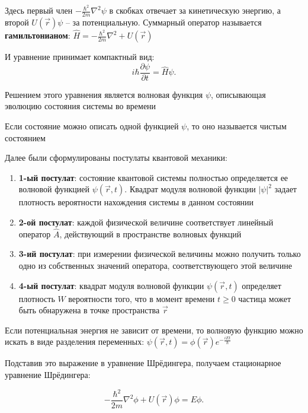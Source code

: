 \documentclass[12pt]{article}
\begin{document}
Здесь первый член $-\frac{\hbar^2}{2m}\nabla^2 \psi$ в скобках отвечает за кинетическую энергию, а второй $U(\vec r) \psi$ -- за потенциальную. Суммарный оператор называется \textbf{гамильтонианом}: $\hat{H} = -\frac{\hbar^2}{2m}\nabla^2 + U(\vec r)$

И уравнение принимает компактный вид:
\[
i\hbar \frac{\partial \psi}{\partial t} = \hat{H}\psi.
\]

\mediumvspace

Решением этого уравнения является волновая функция $\psi$, описывающая эволюцию состояния системы во времени

Если состояние можно описать одной функцией $\psi$, то оно называется чистым состоянием

\mediumvspace

Далее были сформулированы постулаты квантовой механики:

\begin{enumerate}
    \item \textbf{1-ый постулат}: 
    состояние квантовой системы полностью определяется ее волновой функцией $\psi(\vec r, t)$.  
    Квадрат модуля волновой функции $|\psi|^2$ задает плотность вероятности нахождения системы в данном состоянии
    
    \item \textbf{2-ой постулат}:
    каждой физической величине соответствует линейный оператор $\hat{A}$, действующий в пространстве волновых функций
    
    \item \textbf{3-ий постулат}: 
    при измерении физической величины можно получить только одно из собственных значений оператора, соответствующего этой величине
    
    \item \textbf{4-ый постулат}:
    квадрат модуля волновой функции $\psi(\vec r, t)$
    определяет плотность $W$ вероятности того, что в момент времени $t \geq 0$ частица может быть обнаружена в точке пространства $\vec r$ 
\end{enumerate}

\mediumvspace

Если потенциальная энергия не зависит от времени, то волновую функцию можно искать в виде разделения переменных: $\psi(\vec r, t) = \phi(\vec r)e^{-\frac{iEt}{\hbar}}$

Подставив это выражение в уравнение Шрёдингера, получаем стационарное уравнение Шрёдингера:

\[
-\frac{\hbar^2}{2m}\nabla^2 \phi + U(\vec r)\phi = E\phi.
\]
\end{document}
